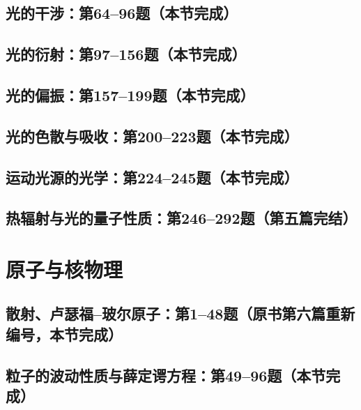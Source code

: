 \documentclass[lang=cn,color=blue,11pt]{elegantbook}
\begin{document}
\section{光的干涉：第64--96题（本节完成）}



\section{光的衍射：第97--156题（本节完成）}






\section{光的偏振：第157--199题（本节完成）}



\section{光的色散与吸收：第200--223题（本节完成）}


\section{运动光源的光学：第224--245题（本节完成）}

\section{热辐射与光的量子性质：第246--292题（第五篇完结）}




\chapter{原子与核物理}
\section{散射、卢瑟福--玻尔原子：第1--48题（原书第六篇重新编号，本节完成）}



\section{粒子的波动性质与薛定谔方程：第49--96题（本节完成）}

\end{document}
